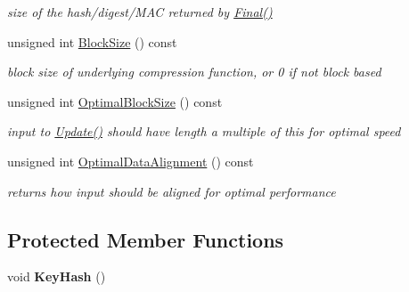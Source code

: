 \begin{DoxyCompactItemize}
\begin{DoxyCompactList}\small\item\em size of the hash/digest/MAC returned by \hyperlink{class_hash_transformation_aa0b8c7a110d8968268fd02ec32b9a8e8}{Final()} \item\end{DoxyCompactList}\item 
\hypertarget{class_hermetic_hash_function_m_a_c_a59b2e0fd6b4a34d600e32ff931bd6d8f}{
unsigned int \hyperlink{class_hermetic_hash_function_m_a_c_a59b2e0fd6b4a34d600e32ff931bd6d8f}{BlockSize} () const }
\label{class_hermetic_hash_function_m_a_c_a59b2e0fd6b4a34d600e32ff931bd6d8f}

\begin{DoxyCompactList}\small\item\em block size of underlying compression function, or 0 if not block based \item\end{DoxyCompactList}\item 
\hypertarget{class_hermetic_hash_function_m_a_c_aceabbeab826dcbd76df0035a41d93ddc}{
unsigned int \hyperlink{class_hermetic_hash_function_m_a_c_aceabbeab826dcbd76df0035a41d93ddc}{OptimalBlockSize} () const }
\label{class_hermetic_hash_function_m_a_c_aceabbeab826dcbd76df0035a41d93ddc}

\begin{DoxyCompactList}\small\item\em input to \hyperlink{class_hermetic_hash_function_m_a_c_ad724a2082e81c4174fdd877030ead35b}{Update()} should have length a multiple of this for optimal speed \item\end{DoxyCompactList}\item 
\hypertarget{class_hermetic_hash_function_m_a_c_adb0185f06080a3325a256e80986de683}{
unsigned int \hyperlink{class_hermetic_hash_function_m_a_c_adb0185f06080a3325a256e80986de683}{OptimalDataAlignment} () const }
\label{class_hermetic_hash_function_m_a_c_adb0185f06080a3325a256e80986de683}

\begin{DoxyCompactList}\small\item\em returns how input should be aligned for optimal performance \item\end{DoxyCompactList}\end{DoxyCompactItemize}
\subsection*{Protected Member Functions}
\begin{DoxyCompactItemize}
\item 
\hypertarget{class_hermetic_hash_function_m_a_c_ac3a4c6ed165fbf4e322e49fcaa7d4677}{
void {\bfseries KeyHash} ()}
\label{class_hermetic_hash_function_m_a_c_ac3a4c6ed165fbf4e322e49fcaa7d4677}

\end{DoxyCompactItemize}
